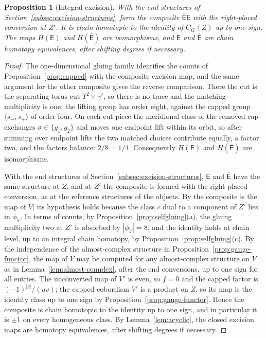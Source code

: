 \documentclass[11pt]{amsart}
\newtheorem{proposition}[theorem]{Proposition}
\theoremstyle{definition}
\theoremstyle{remark}
\theoremstyle{plain}
\numberwithin{equation}{section}
\begin{document}
\begin{proposition}[Integral excision]\label{prop:integral-excision}
With the end structures of Section~\ref{subsec:excision-structures},
form the composite $\overline{\mathsf E}\mathsf E$ with the right-placed
conversion at $Z'$. It is chain homotopic to the identity of $C_G(Z)$ up
to one sign. The maps $H(\mathsf E)$ and $H(\overline{\mathsf E})$ are
isomorphisms, and $\mathsf E$ and $\overline{\mathsf E}$ are chain
homotopy equivalences, after shifting degrees if necessary.
\end{proposition}
\begin{proof}
The one-dimensional gluing family identifies the counts of
Proposition~\ref{prop:capped} with the composite excision map, and the same argument for the
other composite gives the reverse comparison. There the cut is the separating torus cut $T^2\times\gamma'$, so there is
no trace and the matching multiplicity is one; the lifting group has order
eight, against the capped group $\langle s_-,s_+\rangle$ of order four. On
each cut piece the meridional class of the removed cap exchanges
$\sigma\in\{g_1,g_2\}$ and moves one endpoint lift within its orbit, so after
summing over endpoint lifts the two matched choices contribute equally, a
factor two, and the factors balance: $2/8=1/4$. Consequently $H(\mathsf E)$
and $H(\overline{\mathsf E})$ are isomorphisms.

With the end structures of Section~\ref{subsec:excision-structures},
$\mathsf E$ and $\overline{\mathsf E}$ have the same structure at $Z$, and at
$Z'$ the composite is formed with the right-placed conversion, as at the
reference structures of the objects. By \cite[Proposition~5.4]{KM-unknot} the
composite is the map of $V$; its hypothesis holds because the class $c$ dual
to a component of $Z'$ lies in $\phi_V$. In terms of counts, by
Proposition~\ref{prop:selfgluing}(a), the gluing multiplicity two at $Z'$ is
absorbed by $|\phi_V|=8$, and the identity holds at chain level, up to an
integral chain homotopy, by Proposition~\ref{prop:selfgluing}(c). By the
independence of the almost-complex structure in
Proposition~\ref{prop:gauge-functor}, the map of $V$ may be computed for any
almost-complex structure on $V$ as in Lemma~\ref{lem:almost-complex}, after
the end conversions, up to one sign for all entries. The unconverted map of
$V^\circ$ is even, so $f=0$ and the capped factor is $(-1)^{|g|}/(uv)$; the
capped cobordism $V'$ is a product on $Z$, so its map is the identity class up
to one sign by Proposition~\ref{prop:gauge-functor}. Hence the composite is
chain homotopic to the identity up to one sign, and in particular it is $\pm1$
on every homogeneous class. By Lemma~\ref{lem:acyclic}, the closed excision
maps are homotopy equivalences, after shifting degrees if necessary.
\end{proof}
\end{document}
